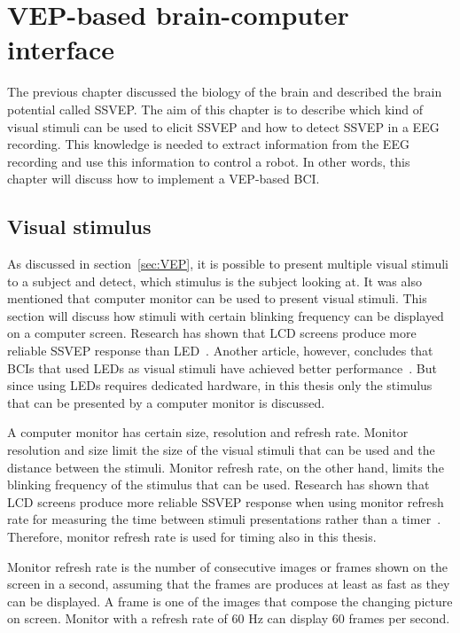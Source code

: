 
\chapter{VEP-based brain-computer interface}

The previous chapter discussed the biology of the brain and described the brain potential called \gls{SSVEP}. The aim of this chapter is to describe which kind of visual stimuli can be used to elicit \gls{SSVEP} and how to detect \gls{SSVEP} in a \gls{EEG} recording. This knowledge is needed to extract information from the \gls{EEG} recording and use this information to control a robot. In other words, this chapter will discuss how to implement a \gls{VEP}-based \gls{BCI}.

\section{Visual stimulus}
\label{sec:stimuli}

As discussed in section~\ref{sec:VEP}, it is possible to present multiple visual stimuli to a subject and detect, which stimulus is the subject looking at. It was also mentioned that computer monitor can be used to present visual stimuli. This section will discuss how stimuli with certain blinking frequency can be displayed on a computer screen. Research has shown that LCD screens produce more reliable \gls{SSVEP} response than \gls{LED}~\cite{lcd_lcd_led}. Another article, however, concludes that \glspl{BCI} that used \glspl{LED} as visual stimuli have achieved better performance~\cite{ssvep_stim}. But since using \glspl{LED} requires dedicated hardware, in this thesis only the stimulus that can be presented by a computer monitor is discussed.

A computer monitor has certain size, resolution and \gls{refresh rate}. Monitor resolution and size limit the size of the visual stimuli that can be used and the distance between the stimuli. Monitor \gls{refresh rate}, on the other hand, limits the blinking frequency of the stimulus that can be used. Research has shown that LCD screens produce more reliable \gls{SSVEP} response when using monitor \gls{refresh rate} for measuring the time between stimuli presentations rather than a timer~\cite{lcd_lcd_led}. Therefore, monitor \gls{refresh rate} is used for timing also in this thesis.

Monitor \gls{refresh rate} is the number of consecutive images or \glspl{frame} shown on the screen in a second, assuming that the \glspl{frame} are produces at least as fast as they can be displayed. A \gls{frame} is one of the images that compose the changing picture on screen. Monitor with a \gls{refresh rate} of 60 Hz can display 60 \glspl{frame} per second. 

